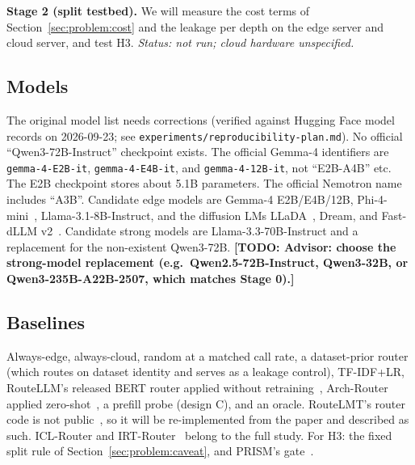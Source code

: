 \documentclass[lettersize,journal]{IEEEtran}
\newcommand{\todo}[1]{\textbf{[TODO: #1]}}
\begin{document}
\textbf{Stage 2 (split testbed).} We will measure the cost terms of
Section~\ref{sec:problem:cost} and the leakage per depth on the edge server and
cloud server, and test H3. \emph{Status: not run; cloud hardware unspecified.}

\subsection{Models}
The original model list needs corrections (verified against Hugging Face model
records on 2026-09-23; see \texttt{experiments/reproducibility-plan.md}).
No official ``Qwen3-72B-Instruct'' checkpoint exists. The official Gemma-4
identifiers are \texttt{gemma-4-E2B-it}, \texttt{gemma-4-E4B-it}, and
\texttt{gemma-4-12B-it}, not ``E2B-A4B'' etc. The E2B checkpoint stores about
5.1B parameters. The official Nemotron name includes ``A3B''. Candidate edge models
are Gemma-4 E2B/E4B/12B, Phi-4-mini~\cite{microsoft2025phi},
Llama-3.1-8B-Instruct, and the diffusion LMs LLaDA~\cite{nie2025large}, Dream,
and Fast-dLLM v2~\cite{wu2025fast}. Candidate strong models are
Llama-3.3-70B-Instruct and a replacement for the non-existent Qwen3-72B.
\todo{Advisor: choose the strong-model replacement (e.g.\ Qwen2.5-72B-Instruct,
Qwen3-32B, or Qwen3-235B-A22B-2507, which matches Stage 0).}

\subsection{Baselines}
Always-edge, always-cloud, random at a matched call rate, a dataset-prior router
(which routes on dataset identity and serves as a leakage control), TF-IDF+LR,
RouteLLM's released BERT router applied without retraining~\cite{ong2025routellm,routellm2024repo},
Arch-Router applied zero-shot~\cite{tran2025arch}, a prefill probe (design C),
and an oracle. RouteLMT's router code is not public~\cite{luo2026routelmt}, so it
will be re-implemented from the paper and described as such. ICL-Router and
IRT-Router~\cite{wang2026icl,song2025irt} belong to the full study. For H3: the
fixed split rule of Section~\ref{sec:problem:caveat}, and PRISM's
gate~\cite{zhan2025prism}.
\end{document}
